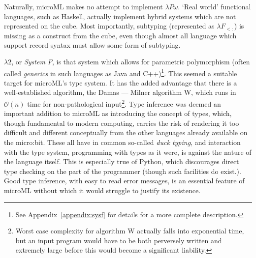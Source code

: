 \documentclass[12pt, a4paper]{report}
\begin{document}
Naturally, microML makes no attempt to implement $\lambda P\omega$. `Real world' functional
languages, such as Haskell, actually implement hybrid systems which are not represented on the cube.
Most importantly, subtyping (represented as $\lambda F_{<:}$) is missing as a construct from the cube, 
even though almost all language which support record syntax must allow some form of subtyping.

$\lambda 2$, or \textit{System F}, is that system which allows for \gls{parametric polymorphism} (often
called \textit{generics} in such languages as Java and C++)\footnote{See Appendix~\ref{appendix:sysf} for
details for a more complete description.}. This seemed a suitable target for microML's type system.
It has the added advantage that there is a well-established algorithm, the Damas --- Milner algorithm
W, which runs in $\mathcal{O}(n)$ time for non-pathological input\footnote{Worst case complexity
for algorithm W actually falls into exponential time, but an input program would have to be both
perversely written and extremely large before this would become a significant liability.}. Type
inference was deemed an important addition to microML as introducing the concept of types, which,
though fundamental to modern computing, carries the risk of rendering it too difficult and different
conceptually from the other languages already available on the micro:bit. These all have in common
so-called \textit{\gls{duck typing}}, and interaction with the type system, programming with types as
it were, is against the nature of the language itself. This is especially true of Python, which
discourages direct type checking on the part of the programmer (though such facilities do exist.).
Good type inference, with easy to read error messages, is an essential feature of microML without
which it would struggle to justify its existence.
\end{document}

